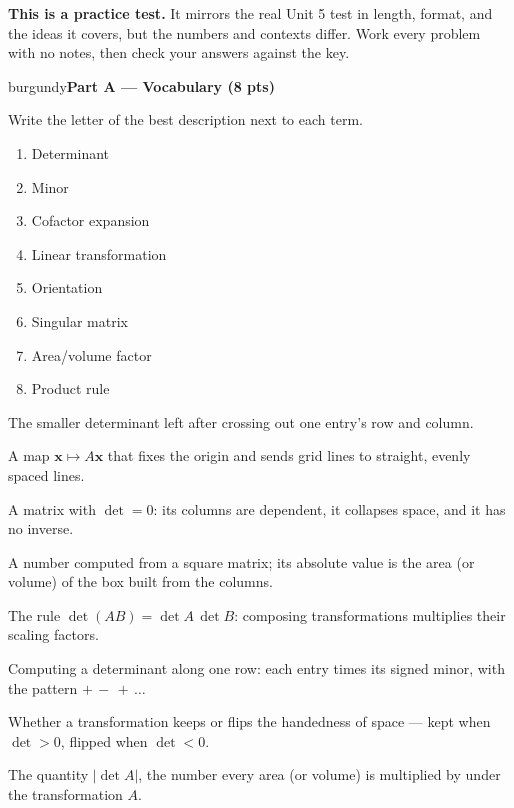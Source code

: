 \documentclass[10pt]{article}
\newcommand{\xx}{\mathbf{x}}
\newcommand{\parthead}[1]{%
  \vspace{6pt}\noindent
  \begin{headlinebox}{burgundy}{\color{white}\bfseries #1}\end{headlinebox}%
  \vspace{4pt}}
\begin{document}
\namedateperiod

\vspace{0.10in}
\begin{remindbox}
\small
\textbf{This is a practice test.} It mirrors the real Unit 5 test in length, format,
and the ideas it covers, but the numbers and contexts differ. Work every problem
with no notes, then check your answers against the key.
\end{remindbox}

\parthead{Part A --- Vocabulary (8 pts)}
Write the letter of the best description next to each term.

\vspace{4pt}
\noindent
\begin{minipage}[t]{0.40\textwidth}
\begin{enumerate}[leftmargin=2.2em, itemsep=7pt, label=\arabic*.]
  \item Determinant 
  \item Minor 
  \item Cofactor expansion 
  \item Linear transformation 
  \item Orientation 
  \item Singular matrix 
  \item Area/volume factor 
  \item Product rule 
\end{enumerate}
\end{minipage}%
\hfill
\begin{minipage}[t]{0.57\textwidth}
\small
\begin{description}[leftmargin=1.4em, itemsep=3pt]
  \item[(A)] The smaller determinant left after crossing out one entry's row and column.
  \item[(B)] A map $\xx\mapsto A\xx$ that fixes the origin and sends grid lines to straight, evenly spaced lines.
  \item[(C)] A matrix with $\det=0$: its columns are dependent, it collapses space, and it has no inverse.
  \item[(D)] A number computed from a square matrix; its absolute value is the area (or volume) of the box built from the columns.
  \item[(E)] The rule $\det(AB)=\det A\,\det B$: composing transformations multiplies their scaling factors.
  \item[(F)] Computing a determinant along one row: each entry times its signed minor, with the pattern $+\,-\,+\,\dots$
  \item[(G)] Whether a transformation keeps or flips the handedness of space --- kept when $\det>0$, flipped when $\det<0$.
  \item[(H)] The quantity $|\det A|$, the number every area (or volume) is multiplied by under the transformation $A$.
\end{description}
\end{minipage}
\end{document}
